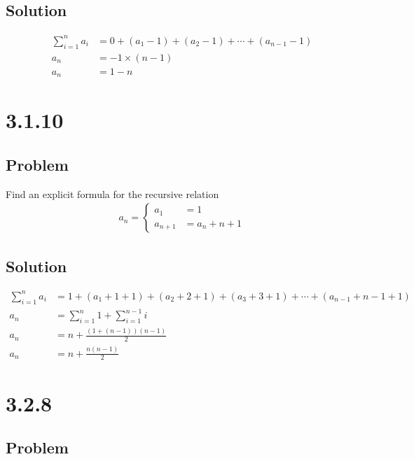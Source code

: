 \documentclass[12pt]{article}
\begin{document}
\subsection*{Solution}

\begin{align*}
    \sum_{i = 1}^n a_i &= 0 + (a_1 - 1) + (a_2 - 1) + \cdots + (a_{n - 1} - 1) \\
    a_n &= -1 \times (n - 1) \\
    a_n &= 1 - n
\end{align*}



\section*{3.1.10}

\subsection*{Problem}

Find an explicit formula for the recursive relation
\begin{align*}
    a_n = \begin{cases}
        a_1 &= 1 \\
        a_{n + 1} &= a_n + n + 1
    \end{cases}
\end{align*}

\subsection*{Solution}

\begin{align*}
    \sum_{i = 1}^n a_i &= 1 + (a_1 + 1 + 1) + (a_2 + 2 + 1) + (a_3 + 3 + 1) + \cdots + (a_{n - 1} + n - 1 + 1) \\
    a_n &= \sum_{i = 1}^n 1 + \sum_{i = 1}^{n - 1} i \\
    a_n &= n + \frac{(1 + (n - 1)) (n - 1)}{2} \\
    a_n &= n + \frac{n(n - 1)}{2}
\end{align*}



\section*{3.2.8}

\subsection*{Problem}
\end{document}
